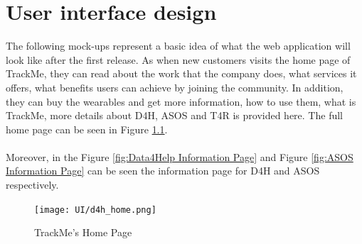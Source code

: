 \documentclass[a4paper, hidelinks, 12pt]{report}
\begin{document}
	\chapter{User interface design}
	The following mock-ups represent a basic idea of what the web application will look like after the first release.
	As when new customers visits the home page of TrackMe, they can read about the work that the company does, what services it offers, what benefits users can achieve by joining the community. In addition, they can buy the wearables and get more information, how to use them, what is TrackMe, more details about D4H, ASOS and T4R is provided here. The full home page can be seen in Figure \ref{fig:Home_Page}. \\\\
	Moreover, in the Figure \ref{fig:Data4Help Information Page} and Figure \ref{fig:ASOS Information Page} can be seen the information page for D4H and ASOS respectively.
	
	\begin{figure}[H]
		\centering
		\texttt{[image: UI/d4h\_home.png]}
		\caption[UI: TrackMe's Home Page]{TrackMe's Home Page}
		\label{fig:Home_Page}
	\end{figure}
	
\end{document}
